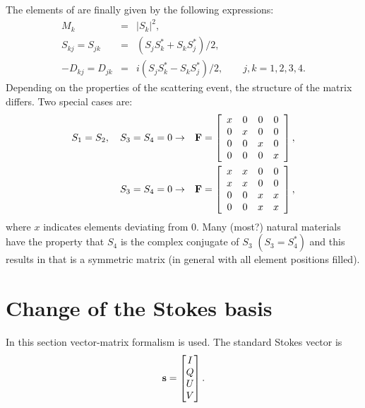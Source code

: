 The elements of  are finally given by the following
expressions:
\begin{eqnarray}
  M_k &=& |S_k|^2, \\
  S_{kj} = S_{jk} &=& (S_jS_k^\ast+S_kS_j^\ast)/2, \\
  -D_{kj} = D_{jk} &=& i(S_jS_k^\ast-S_kS_j^\ast)/2, \qquad j,k= 1, 2, 3, 4.
\end{eqnarray}
Depending on the properties of the scattering event, the structure of
the matrix  differs. Two special cases are:
\begin{eqnarray}
  \label{eq:Fcase1}
  S_1=S_2,\quad S_3=S_4=0 &\to&    \mathbf{F} =
      \left[\begin{array}{cccc}
        x&0&0&0\\
        0&x&0&0\\
        0&0&x&0\\
        0&0&0&x
      \end{array}
      \right], \\
  \label{eq:Fcase2}
  S_3=S_4=0 &\to&    \mathbf{F} =
      \left[\begin{array}{cccc}
        x&x&0&0\\
        x&x&0&0\\
        0&0&x&x\\
        0&0&x&x
      \end{array}
      \right],
\end{eqnarray}
where $x$ indicates elements deviating from 0. Many (most?)  natural
materials have the property that $S_4$ is the complex conjugate of
$S_3$ $(S_3=S_4^\ast)$ and this results in that  is a
symmetric matrix (in general with all element positions filled).


\section{Change of the Stokes basis}
\label{sec:polarization:basis}
%
In this section vector-matrix formalism is used. The standard Stokes vector
is
\begin{equation}
  \mathbf{s} = \begin{bmatrix} I\\Q\\U\\V \end{bmatrix}.
\end{equation}

